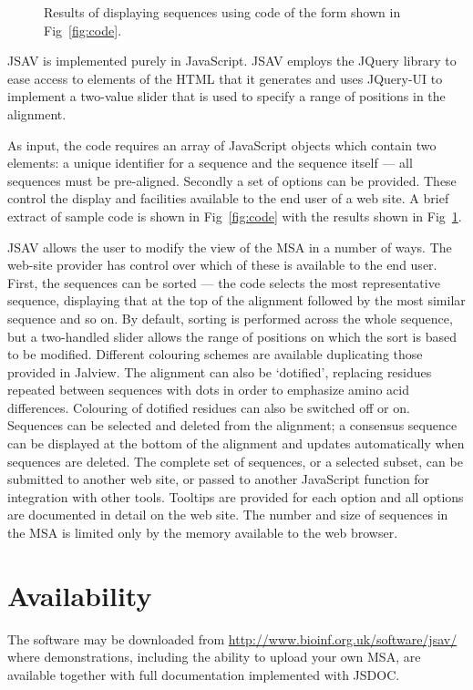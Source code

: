 \documentclass[a4]{bioinfo}
\begin{document}
\begin{figure}
\caption{\label{fig:demo}Results of displaying sequences using 
  code of the form shown in Fig~\ref{fig:code}.}
\end{figure}

JSAV is implemented purely in JavaScript. JSAV employs the JQuery
library to ease access to elements of the HTML that it generates and
uses JQuery-UI to implement a two-value slider that is used to specify
a range of positions in the alignment.

As input, the code requires an array of JavaScript objects which
contain two elements: a unique identifier for a sequence and the
sequence itself --- all sequences must be pre-aligned.  Secondly a set
of options can be provided. These control the display and facilities
available to the end user of a web site.  A brief extract of sample
code is shown in Fig~\ref{fig:code} with the results shown in
Fig~\ref{fig:demo}.

JSAV allows the user to modify the view of the MSA in a number of
ways. The web-site provider has control over which of these is
available to the end user. First, the sequences can be sorted --- the
code selects the most representative sequence, displaying that at the
top of the alignment followed by the most similar sequence and so
on. By default, sorting is performed across the whole sequence, but a
two-handled slider allows the range of positions on which the sort is
based to be modified. Different colouring schemes are available
duplicating those provided in Jalview. The alignment can also be
`dotified', replacing residues repeated between sequences with dots in
order to emphasize amino acid differences. Colouring of dotified
residues can also be switched off or on. Sequences can be selected and
deleted from the alignment; a consensus sequence can be displayed at
the bottom of the alignment and updates automatically when sequences
are deleted. The complete set of sequences, or a selected subset, can
be submitted to another web site, or passed to another JavaScript
function for integration with other tools. Tooltips are provided for
each option and all options are documented in detail on the web
site. The number and size of sequences in the MSA is limited only by
the memory available to the web browser.

\section{Availability}
The software may be downloaded from
\url{http://www.bioinf.org.uk/software/jsav/} where demonstrations,
including the ability to upload your own MSA, are available together
with full documentation implemented with JSDOC.


\end{document}
